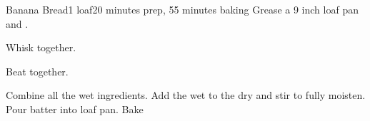\documentclass[../Cookbook.tex]{subfiles}
\begin{document}
\begin{recipe}{Banana Bread}{1 loaf}{20 minutes prep, 55 minutes baking}
	Grease a 9 inch loaf pan and .

	Whisk together.

	Beat together.

	Combine all the wet ingredients.
	Add the wet to the dry and stir to fully moisten.
	Pour batter into loaf pan.
	Bake 
\end{recipe}
\end{document}
